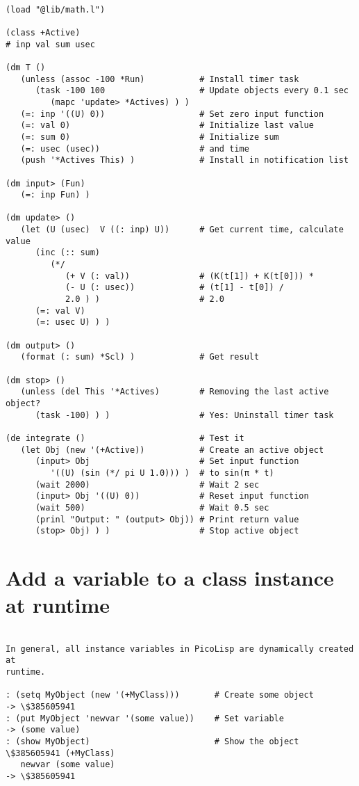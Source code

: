 \begin{verbatim}

(load "@lib/math.l")

(class +Active)
# inp val sum usec

(dm T ()
   (unless (assoc -100 *Run)           # Install timer task
      (task -100 100                   # Update objects every 0.1 sec
         (mapc 'update> *Actives) ) )
   (=: inp '((U) 0))                   # Set zero input function
   (=: val 0)                          # Initialize last value
   (=: sum 0)                          # Initialize sum
   (=: usec (usec))                    # and time
   (push '*Actives This) )             # Install in notification list

(dm input> (Fun)
   (=: inp Fun) )

(dm update> ()
   (let (U (usec)  V ((: inp) U))      # Get current time, calculate value
      (inc (:: sum)
         (*/
            (+ V (: val))              # (K(t[1]) + K(t[0])) *
            (- U (: usec))             # (t[1] - t[0]) /
            2.0 ) )                    # 2.0
      (=: val V)
      (=: usec U) ) )

(dm output> ()
   (format (: sum) *Scl) )             # Get result

(dm stop> ()
   (unless (del This '*Actives)        # Removing the last active object?
      (task -100) ) )                  # Yes: Uninstall timer task

(de integrate ()                       # Test it
   (let Obj (new '(+Active))           # Create an active object
      (input> Obj                      # Set input function
         '((U) (sin (*/ pi U 1.0))) )  # to sin(π * t)
      (wait 2000)                      # Wait 2 sec
      (input> Obj '((U) 0))            # Reset input function
      (wait 500)                       # Wait 0.5 sec
      (prinl "Output: " (output> Obj)) # Print return value
      (stop> Obj) ) )                  # Stop active object

\end{verbatim}

\section*{Add a variable to a class instance at runtime}

\begin{verbatim}

In general, all instance variables in PicoLisp are dynamically created at
runtime.

: (setq MyObject (new '(+MyClass)))       # Create some object
-> \$385605941
: (put MyObject 'newvar '(some value))    # Set variable
-> (some value)
: (show MyObject)                         # Show the object
\$385605941 (+MyClass)
   newvar (some value)
-> \$385605941

\end{verbatim}


